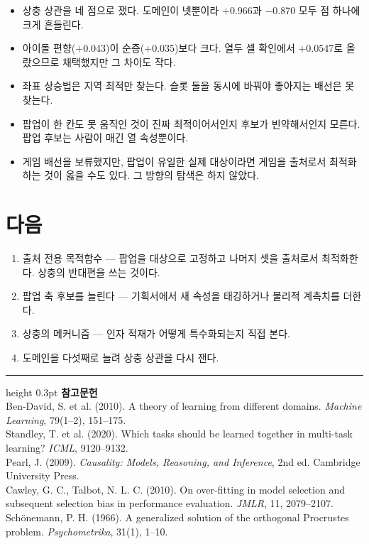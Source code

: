\documentclass[10pt]{article}
\begin{document}
\begin{itemize}[leftmargin=1.1em,itemsep=0.15em]
\item 상충 상관을 네 점으로 쟀다. 도메인이 넷뿐이라 $+$0.966과 $-$0.870 모두
      점 하나에 크게 흔들린다.
\item 아이돌 편향($+$0.043)이 순증($+$0.035)보다 크다. 열두 셀 확인에서
      $+$0.0547로 올랐으므로 채택했지만 그 차이도 작다.
\item 좌표 상승법은 지역 최적만 찾는다. 슬롯 둘을 동시에 바꿔야 좋아지는 배선은
      못 찾는다.
\item 팝업이 한 칸도 못 움직인 것이 진짜 최적이어서인지 후보가 빈약해서인지
      모른다. 팝업 후보는 사람이 매긴 열 속성뿐이다.
\item 게임 배선을 보류했지만, 팝업이 유일한 실제 대상이라면 게임을 출처로서
      최적화하는 것이 옳을 수도 있다. 그 방향의 탐색은 하지 않았다.
\end{itemize}

\section{다음}

\begin{enumerate}[leftmargin=1.3em,itemsep=0.15em]
\item 출처 전용 목적함수 --- 팝업을 대상으로 고정하고 나머지 셋을 출처로서
      최적화한다. 상충의 반대편을 쓰는 것이다.
\item 팝업 축 후보를 늘린다 --- 기획서에서 새 속성을 태깅하거나 물리적 계측치를
      더한다.
\item 상충의 메커니즘 --- 인자 적재가 어떻게 특수화되는지 직접 본다.
\item 도메인을 다섯째로 늘려 상충 상관을 다시 잰다.
\end{enumerate}

\vspace{0.6em}
\hrule height 0.3pt
\vspace{0.5em}
{\footnotesize
\textbf{참고문헌}\\[0.3em]
Ben-David, S. et al. (2010). A theory of learning from different domains.
\emph{Machine Learning}, 79(1--2), 151--175.\\[0.15em]
Standley, T. et al. (2020). Which tasks should be learned together in multi-task
learning? \emph{ICML}, 9120--9132.\\[0.15em]
Pearl, J. (2009). \emph{Causality: Models, Reasoning, and Inference}, 2nd ed.
Cambridge University Press.\\[0.15em]
Cawley, G. C., Talbot, N. L. C. (2010). On over-fitting in model selection and
subsequent selection bias in performance evaluation. \emph{JMLR}, 11, 2079--2107.\\[0.15em]
Schönemann, P. H. (1966). A generalized solution of the orthogonal Procrustes
problem. \emph{Psychometrika}, 31(1), 1--10.
}
\end{document}
